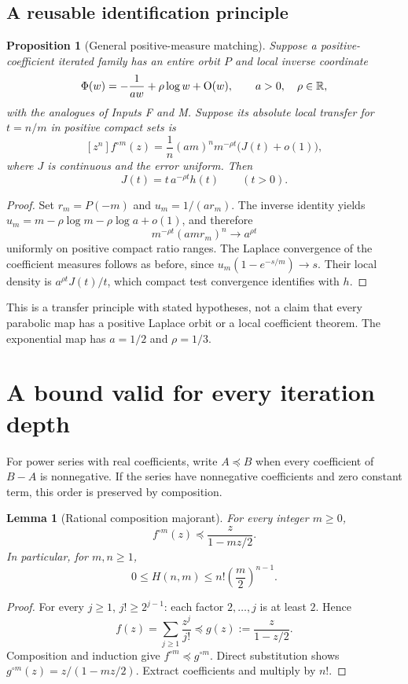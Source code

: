 \documentclass[11pt,letterpaper]{article}
\newtheorem{lemma}[theorem]{Lemma}
\newtheorem{proposition}[theorem]{Proposition}
\theoremstyle{remark}\newtheorem{remark}[theorem]{Remark}
\newcommand{\Oh}{\mathrm O}\newcommand{\supp}{\operatorname{supp}}
\newcommand{\coef}[1]{[z^{#1}]}
\begin{document}
\subsection{A reusable identification principle}
\begin{proposition}[General positive-measure matching]\label{ied:par:prop:general}
Suppose a positive-coefficient iterated family has an entire orbit $P$
and local inverse coordinate
\[
 \Phi(w)=-\frac1{aw}+\rho\log w+\Oh(w),
 \qquad a>0,\quad\rho\in\R,
\]
with the analogues of Inputs F and M. Suppose its absolute local transfer
for $t=n/m$ in positive compact sets is
\[
 \coef n f^{\circ m}(z)
 =\frac1n(am)^n m^{-\rho t}\bigl(J(t)+o(1)\bigr),
\]
where $J$ is continuous and the error uniform. Then
\[
 J(t)=t\,a^{-\rho t}h(t)\qquad(t>0).
\]
\end{proposition}
\begin{proof}
Set $r_m=P(-m)$ and $u_m=1/(ar_m)$.
The inverse identity yields
$u_m=m-\rho\log m-\rho\log a+o(1)$, and therefore
\[
 m^{-\rho t}(amr_m)^n\longrightarrow a^{\rho t}
\]
uniformly on positive compact ratio ranges.
The Laplace convergence of the coefficient measures follows as before,
since $u_m(1-e^{-s/m})\to s$.
Their local density is $a^{\rho t}J(t)/t$, which compact test
convergence identifies with $h$.
\end{proof}
This is a transfer principle with stated hypotheses, not a claim that
every parabolic map has a positive Laplace orbit or a local coefficient
theorem. The exponential map has $a=1/2$ and $\rho=1/3$.

\section{A bound valid for every iteration depth}\label{ied:par:sec:majorant}

For power series with real coefficients, write $A\preceq B$ when every
coefficient of $B-A$ is nonnegative. If the series have nonnegative
coefficients and zero constant term, this order is preserved by
composition.

\begin{lemma}[Rational composition majorant]\label{ied:par:lem:majorant}
For every integer $m\ge0$,
\begin{equation}\label{ied:par:eq:majorantseries}
 f^{\circ m}(z)\preceq\frac{z}{1-mz/2}.
\end{equation}
In particular, for $m,n\ge1$,
\begin{equation}\label{ied:par:eq:Hmajorant}
 0\le H(n,m)\le n!\left(\frac m2\right)^{n-1}.
\end{equation}
\end{lemma}
\begin{proof}
For every $j\ge1$, $j!\ge2^{j-1}$: each factor $2,\ldots,j$ is at least
$2$. Hence
\[
 f(z)=\sum_{j\ge1}\frac{z^j}{j!}\preceq
 g(z):=\frac{z}{1-z/2}.
\]
Composition and induction give $f^{\circ m}\preceq g^{\circ m}$.
Direct substitution shows $g^{\circ m}(z)=z/(1-mz/2)$.
Extract coefficients and multiply by $n!$.
\end{proof}
\end{document}
